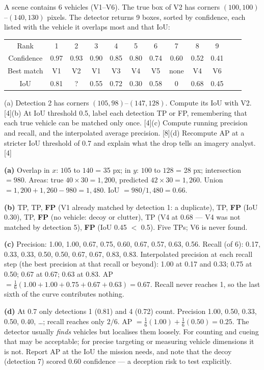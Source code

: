 \documentclass[11pt]{article}
\begin{document}
\begin{prob}A scene contains 6 vehicles (V1--V6). The true box of V2 has corners $(100,100)$--$(140,130)$ pixels. The detector returns 9 boxes, sorted by confidence, each listed with the vehicle it overlaps most and that IoU:

\begin{center}\small\begin{tabular}{@{}cccccccccccc@{}}\toprule Rank&1&2&3&4&5&6&7&8&9\\
Confidence&0.97&0.93&0.90&0.85&0.80&0.74&0.60&0.52&0.41\\
Best match&V1&V2&V1&V3&V4&V5&none&V4&V6\\
IoU&0.81&?&0.55&0.72&0.30&0.58&0&0.68&0.45\\\bottomrule
\end{tabular}\end{center}

(a) Detection 2 has corners $(105,98)$--$(147,128)$. Compute its IoU with V2. [4]\newline (b) At IoU threshold 0.5, label each detection TP or FP, remembering that each true vehicle can be matched only once. [4]\newline (c) Compute running precision and recall, and the interpolated average precision. [8]\newline (d) Recompute AP at a stricter IoU threshold of 0.7 and explain what the drop tells an imagery analyst. [4]\end{prob}

\begin{soln}\textbf{(a)} Overlap in $x$: $105$ to $140$ = 35 px; in $y$: $100$ to $128$ = 28 px; intersection $=980$. Areas: true $40\times30=1{,}200$, predicted $42\times30=1{,}260$. Union $=1{,}200+1{,}260-980=1{,}480$. IoU $=980/1{,}480=\mathbf{0.66}$.

\textbf{(b)} TP, TP, \textbf{FP} (V1 already matched by detection 1: a duplicate), TP, \textbf{FP} (IoU 0.30), TP, \textbf{FP} (no vehicle: decoy or clutter), TP (V4 at 0.68 --- V4 was not matched by detection 5), \textbf{FP} (IoU 0.45 $<$ 0.5). Five TPs; V6 is never found.

\textbf{(c)} Precision: 1.00, 1.00, 0.67, 0.75, 0.60, 0.67, 0.57, 0.63, 0.56. Recall (of 6): 0.17, 0.33, 0.33, 0.50, 0.50, 0.67, 0.67, 0.83, 0.83. Interpolated precision at each recall step (the best precision at that recall or beyond): 1.00 at 0.17 and 0.33; 0.75 at 0.50; 0.67 at 0.67; 0.63 at 0.83. AP $=\frac16(1.00+1.00+0.75+0.67+0.63)=\mathbf{0.67}$. Recall never reaches 1, so the last sixth of the curve contributes nothing.

\textbf{(d)} At 0.7 only detections 1 (0.81) and 4 (0.72) count. Precision 1.00, 0.50, 0.33, 0.50, 0.40, \ldots{}; recall reaches only $2/6$. AP $=\frac16(1.00)+\frac16(0.50)=\mathbf{0.25}$. The detector usually \textit{finds} vehicles but localises them loosely. For counting and cueing that may be acceptable; for precise targeting or measuring vehicle dimensions it is not. Report AP at the IoU the mission needs, and note that the decoy (detection 7) scored 0.60 confidence --- a deception risk to test explicitly.\end{soln}
\end{document}
